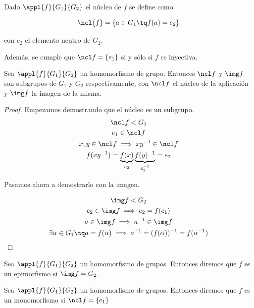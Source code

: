 \documentclass{apuntes}
\begin{document}
\begin{defn}
Dado $\appl{f}{G_1}{G_2}$ el núcleo de $f$ se define como 

\[ \ncl{f} = \{ a\in G_1 \tq f(a) = e_2\} \]

con $e_2$ el elemento neutro de $G_2$. 

Además, se cumple que $\ncl f = \{ e_1 \}$ si y sólo si $f$ es inyectiva.
\end{defn}

\begin{theorem}
 Sea $\appl{f}{G_1}{G_2}$ un homomorfismo de grupo. Entonces $\ncl f$ y $\img f$ son subgrupos de $G_1$ y $G_2$ respectivamente, con $\ncl f$ el núcleo de la aplicación y $\img f$ la imagen de la misma.
 \end{theorem}
 
 \begin{proof} Empezamos demostrando que el núcleo es un subgrupo.
 \begin{gather*}
  \ncl f < G_1 \\
 e_1 \in \ncl f \\
 x, y \in \ncl f \implies xy^{-1}\in \ncl f \\
 f(xy^{-1}) = \underbrace{f(x)}_{e_2} \underbrace{f(y)^{-1}}_{e_2^{-1}} = e_2
 \end{gather*}
 
Pasamos ahora a demostrarlo con la imagen.

\begin{gather*}
\img f < G_2 \\
 e_2\in \img f \implies e_2 = f(e_1)\\
 a\in \img f \implies a^{-1}\in \img f\\
 \exists \alpha \in G_1 \tq a=f(\alpha ) \implies a^{-1} = (f(\alpha ))^{-1} = f(\alpha ^{-1})
 \end{gather*}
 
 \end{proof}

\begin{defn}[Epimorfismo]
Sea $\appl{f}{G_1}{G_2}$ un homomorfismo de grupos. Entonces diremos que $f$ es un epimorfismo si $\img f = G_2$.
\end{defn}

\begin{defn}[Monomorfismo]
Sea $\appl{f}{G_1}{G_2}$ un homomorfismo de grupos. Entonces diremos que $f$ es un monomorfismo si $\ncl f = \{ e_1\} $
\end{defn}
\end{document}
